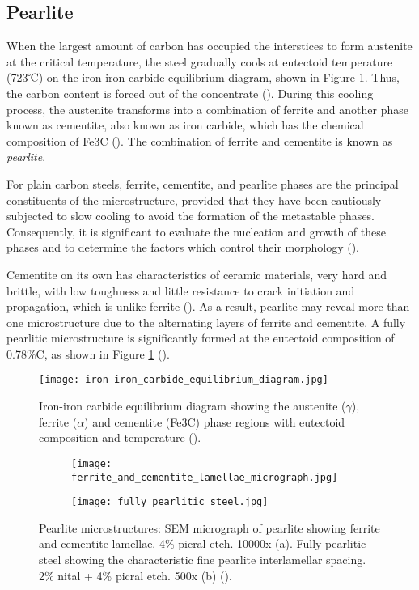 \subsection{Pearlite}
When the largest amount of carbon has occupied the interstices to form austenite at the critical temperature, the steel gradually cools at eutectoid temperature (723℃) on the iron-iron carbide equilibrium diagram, shown in Figure \ref{ch3:figure:equilibrium}. Thus, the carbon content is forced out of the concentrate  (\cite{bhadeshia2017steels}). During this cooling process, the austenite transforms into a combination of ferrite and another phase known as cementite, also known as iron carbide, which has the chemical composition of Fe3C (\cite{cmrp2014maintenance}). The combination of ferrite and cementite is known as \emph{pearlite}.

For plain carbon steels, ferrite, cementite, and pearlite phases are the principal constituents of the microstructure, provided that they have been cautiously subjected to slow cooling to avoid the formation of the metastable phases. Consequently, it is significant to evaluate the nucleation and growth of these phases and to determine the factors which control their morphology (\cite{bhadeshia2017steels}).

Cementite on its own has characteristics of ceramic materials, very hard and brittle, with low toughness and little resistance to crack initiation and propagation, which is unlike ferrite (\cite{bajaj2020steels}). As a result, pearlite may reveal more than one microstructure due to the alternating layers of ferrite and cementite. A fully pearlitic microstructure is significantly formed at the eutectoid composition of 0.78\%C, as shown in Figure \ref{ch3:figure:equilibrium} (\cite{molabe2018determining}).
\begin{figure}[H]
    \centering
    \texttt{[image: iron-iron\_carbide\_equilibrium\_diagram.jpg]}
    \caption{Iron-iron carbide equilibrium diagram showing the austenite ($\gamma$), ferrite ($\alpha$) and cementite (Fe3C) phase regions with eutectoid composition and temperature (\cite{cmrp2014maintenance}).}
    \label{ch3:figure:equilibrium}
\end{figure}
\begin{figure}[H]
\centering
\begin{subfigure}{.45\textwidth}
    \centering
    \texttt{[image: ferrite\_and\_cementite\_lamellae\_micrograph.jpg]}
    \caption{}
\end{subfigure}
\begin{subfigure}{.45\textwidth}
    \centering
    \texttt{[image: fully\_pearlitic\_steel.jpg]}
    \caption{}
\end{subfigure}

\caption{Pearlite microstructures: SEM micrograph of pearlite showing ferrite and cementite lamellae. 4\% picral etch. 10000x (a). Fully pearlitic steel showing the characteristic fine pearlite interlamellar spacing. 2\% nital + 4\% picral etch. 500x (b) (\cite{molabe2018determining}).}
\label{ch3:figure:pearlite:microstructures}
\end{figure}

